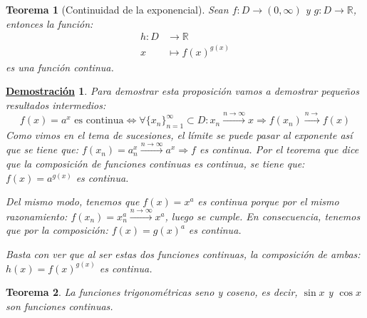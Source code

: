 \documentclass[10pt,a4paper,openright]{book}
\theoremstyle{break}
\newtheorem{theo}{Teorema}[chapter]
\newtheorem*{demo}{\underline{Demostración}}
\begin{document}
\begin{theo}[Continuidad de la exponencial]
Sean $f: D\rightarrow (0,\infty)$ y $g: D\rightarrow \mathbb R$, entonces la función:
\begin{eqnarray*}
h: D &\longrightarrow \mathbb R \\
x &\longmapsto f(x)^{g(x)}
\end{eqnarray*}
es una función continua. 
\end{theo}
\begin{demo}
Para demostrar esta proposición vamos a demostrar pequeños resultados intermedios:
$$f(x)=a^x \mbox{ es continua} \Leftrightarrow \forall\{x_n\}_{n=1}^\infty\subset D: x_n\xrightarrow{n\rightarrow\infty} x\Rightarrow f(x_n)\xrightarrow{n\rightarrow} f(x)$$
Como vimos en el tema de sucesiones, el límite se puede pasar al exponente así que se tiene que: $f(x_n)=a^x_n\xrightarrow{n\rightarrow\infty} a^x\Rightarrow f$ es continua. Por el teorema que dice que la composición de funciones continuas es continua, se tiene que: $f(x)=a^{g(x)}$ es continua.

Del mismo modo, tenemos que $f(x)=x^a$ es continua porque por el mismo razonamiento: $f(x_n)=x_n^a\xrightarrow{n\rightarrow\infty} x^a$, luego se cumple. En consecuencia, tenemos que por la composición: $f(x)=g(x)^a$ es continua.

Basta con ver que al ser estas dos funciones continuas, la composición de ambas: $h(x)=f(x)^{g(x)}$ es continua.
\end{demo}

\begin{theo}
La funciones trigonométricas seno y coseno, es decir, $\sin x$ y $\cos x$ son funciones continuas.
\end{theo}
\end{document}
